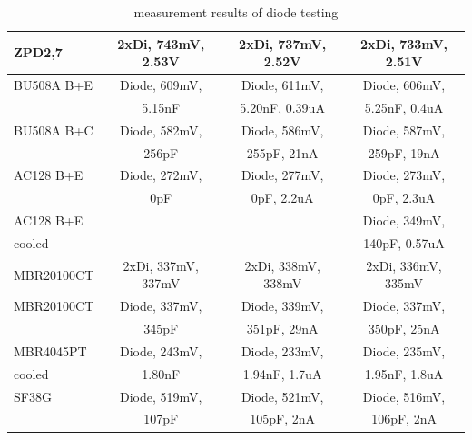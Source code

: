 \begin{table}[H]
\begin{center}
\begin{tabular}{| l | c | c | c |}
ZPD2,7     & 2xDi, 743mV, 2.53V   & 2xDi, 737mV, 2.52V  & 2xDi, 733mV, 2.51V \\
    \hline
BU508A B+E & Diode, 609mV,        & Diode, 611mV,                & Diode, 606mV,              \\
           &               5.15nF &               5.20nF, 0.39uA &               5.25nF, 0.4uA\\
    \hline
BU508A B+C & Diode, 582mV,        & Diode, 586mV,             & Diode, 587mV,            \\
           &               256pF  &               255pF, 21nA &               259pF, 19nA\\
    \hline
AC128 B+E  & Diode, 272mV,        & Diode, 277mV,              & Diode, 273mV,             \\
           &               0pF    &               0pF, 2.2uA   &               0pF, 2.3uA  \\
    \hline
AC128 B+E  &                      &                     & Diode, 349mV,               \\
cooled     &                      &                     &               140pF, 0.57uA \\
    \hline
MBR20100CT & 2xDi, 337mV, 337mV   & 2xDi, 338mV, 338mV  & 2xDi, 336mV, 335mV  \\
    \hline
MBR20100CT & Diode, 337mV,        & Diode, 339mV,             & Diode, 337mV,            \\
           &               345pF  &               351pF, 29nA &               350pF, 25nA\\
    \hline
MBR4045PT  & Diode, 243mV,        & Diode, 233mV,               & Diode, 235mV,              \\
cooled     &               1.80nF &               1.94nF, 1.7uA &               1.95nF, 1.8uA\\
    \hline
SF38G      & Diode, 519mV,        & Diode, 521mV,            & Diode, 516mV,            \\
           &               107pF  &               105pF, 2nA &               106pF, 2nA \\
    \hline
    \end{tabular}
  \end{center}
  \caption{measurement results of diode testing}
  \label{tab:diodes} 
\end{table}

